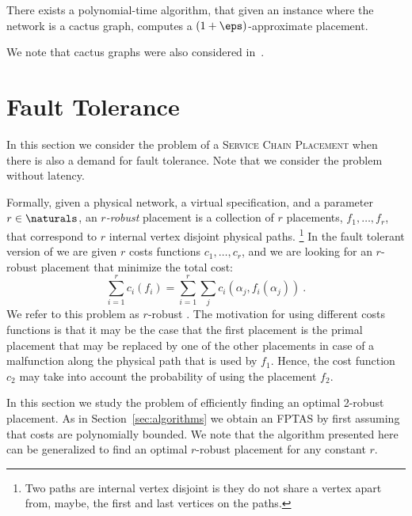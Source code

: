 \begin{theorem}
There exists a polynomial-time algorithm, that given an \scp instance
where the network is a cactus graph, computes a $(1+\eps)$-approximate
placement.
\end{theorem}

We note that cactus graphs were also considered in~\cite{FPS17}.


\section{Fault Tolerance}

In this section we consider the problem of a \textsc{Service Chain
  Placement} when there is also a demand for fault tolerance.  Note
that we consider the problem without latency.

Formally, given a physical network, a virtual specification, and a
parameter $r \in \naturals$, an \emph{$r$-robust} placement is a
collection of $r$ placements, $f_1,\ldots,f_r$, that correspond to $r$
internal vertex disjoint physical paths.%
\footnote{Two paths are internal vertex disjoint is they do not share
  a vertex apart from, maybe, the first and last vertices on the
  paths.}
%
In the fault tolerant
version of \scp we are given $r$ costs functions $c_1,\ldots,c_r$, and
we are looking for an $r$-robust placement that minimize the total
cost:
\[
\sum_{i=1}^r c_i(f_i) = \sum_{i = 1}^r \sum_j c_i(\alpha_j,f_i(\alpha_j))
~.
\]
We refer to this problem as $r$-robust \scp.
%
The motivation for using different costs functions is that it may be
the case that the first placement is the primal placement that may be
replaced by one of the other placements in case of a malfunction along
the physical path that is used by $f_1$.  Hence, the cost function
$c_2$ may take into account the probability of using the placement
$f_2$.

In this section we study the problem of efficiently finding an optimal
2-robust placement.  As in Section~\ref{sec:algorithms} we obtain an
FPTAS by first assuming that costs are polynomially bounded.  We note
that the algorithm presented here can be generalized to find an
optimal $r$-robust placement for any constant $r$.

